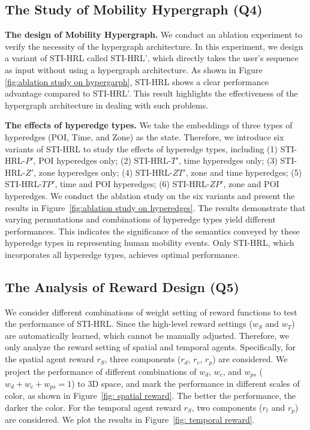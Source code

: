 \documentclass[letterpaper]{article} %
\begin{document}
\subsection{The Study of Mobility Hypergraph (Q4)}
\noindent \textbf{The design of Mobility Hypergraph.} 
We conduct an ablation experiment to verify the necessity of the hypergraph architecture. In this experiment, we design a variant of STI-HRL called STI-HRL', which directly takes the user's sequence as input without using a hypergraph architecture. As shown in Figure \ref{fig:ablation study on hypergarph}, STI-HRL shows a clear performance advantage compared to STI-HRL'. This result highlights the effectiveness of the hypergraph architecture in dealing with such problems.

\noindent\textbf{The effects of hyperedge types.}  
We take the embeddings of three types of hyperedges (POI, Time, and Zone) as the state.
Therefore, we introduce six variants of STI-HRL to study the effects of hyperedge types, including
(1) STI-HRL-$P'$, POI hyperedges only; (2) STI-HRL-$T'$, time hyperedges only; (3) STI-HRL-$Z'$, zone hyperedges only; (4) STI-HRL-$ZT'$, zone and time hyperedges; (5) STI-HRL-$TP'$, time and POI hyperedges; (6) STI-HRL-$ZP'$, zone and POI hyperedges. 
We conduct the ablation study on the six variants and present the results in Figure~\ref{fig:ablation study on hyperedges}. 
The results demonstrate that varying permutations and combinations of hyperedge types yield different performances. 
This indicates the significance of the semantics conveyed by these hyperedge types in representing human mobility events. 
Only STI-HRL, which incorporates all hyperedge types, achieves optimal performance.

\subsection{The Analysis of Reward Design (Q5)} 
We consider different combinations of weight setting of reward functions to test the performance of STI-HRL. 
Since the high-level reward settings ($w_S$ and $w_T$) are automatically learned, which cannot be manually adjusted. 
Therefore, we only analyze the reward setting of spatial and temporal agents.
Specifically, for the spatial agent reward $r_S$, three components ($r_d$, $r_c$, $r_p$) are considered. We project the performance of different combinations of $w_d$, $w_c$, and $w_{ps}$ ($w_d+w_c+w_{ps}=1$) to 3D space, and mark the performance in different scales of color, as shown in Figure~\ref{fig: spatial reward}. 
The better the performance, the darker the color. 
For the temporal agent reward $r_S$, two components ($r_t$ and $r_p$) are considered. 
We plot the results in Figure~\ref{fig: temporal reward}. 
\end{document}
